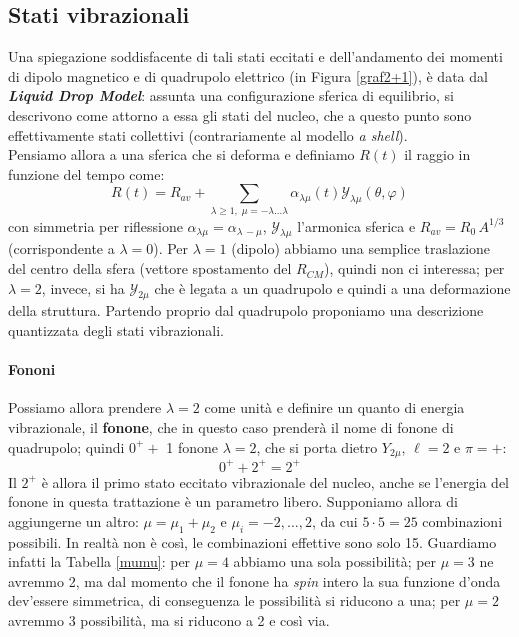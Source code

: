 \subsection{Stati vibrazionali}
Una spiegazione soddisfacente di tali stati eccitati e dell'andamento dei momenti di dipolo magnetico e di quadrupolo elettrico (in Figura \ref{graf2+1}), è data dal \textbf{\textit{Liquid Drop Model}}: assunta una configurazione sferica di equilibrio, si descrivono come  attorno a essa gli stati del nucleo, che a questo punto sono effettivamente stati collettivi (contrariamente al modello \textit{a shell}).\\
Pensiamo allora a una  sferica che si deforma e definiamo $R(t)$ il raggio in funzione del tempo come:
$$R(t) = R_{av} + \sum_{\lambda\geq 1,\; \mu=-\lambda \dots \lambda}\alpha_{\lambda \mu}(t) \mathcal{Y}_{\lambda\mu}(\theta,\varphi)$$
con simmetria per riflessione $\alpha_{\lambda\mu} = \alpha_{\lambda\,-\mu}$, $\mathcal{Y}_{\lambda\mu}$ l'armonica sferica e $R_{av}=R_0\,A^{1/3}$ (corrispondente a $\lambda = 0$). Per $\lambda=1$ (dipolo) abbiamo una semplice traslazione del centro della sfera (vettore spostamento del $R_{CM}$), quindi non ci interessa; per $\lambda = 2$, invece, si ha $\mathcal{Y}_{2\mu}$ che è legata a un quadrupolo e quindi a una deformazione della struttura. Partendo proprio dal quadrupolo proponiamo una descrizione quantizzata degli stati vibrazionali.

\paragraph{Fononi} Possiamo allora prendere $\lambda=2 $ come unità e definire un quanto di energia vibrazionale, il \textbf{fonone}, che  in questo caso prenderà il nome di fonone di quadrupolo; quindi $0^+ + $ 1 fonone $\lambda=2$, che si porta dietro $Y_{2\mu}$, $\ell =2$ e $\pi=+$:
$$0^+ + 2^+ = 2^+$$
Il $2^+$ è allora il primo stato eccitato vibrazionale del nucleo, anche se l'energia del fonone in questa trattazione è un parametro libero. Supponiamo allora di aggiungerne un altro: $\mu = \mu_1 + \mu_2$ e $\mu_i = -2, \dots, 2$, da cui $5\cdot 5 = 25$ combinazioni possibili. In realtà non è così, le combinazioni effettive sono solo 15. Guardiamo infatti la Tabella \ref{mumu}: per $\mu=4$ abbiamo una sola possibilità; per $\mu=3$ ne avremmo 2, ma dal momento che il fonone ha \textit{spin} intero la sua funzione d'onda dev'essere simmetrica, di conseguenza le possibilità si riducono a una; per $\mu = 2$ avremmo 3 possibilità, ma si riducono a 2 e così via. 

